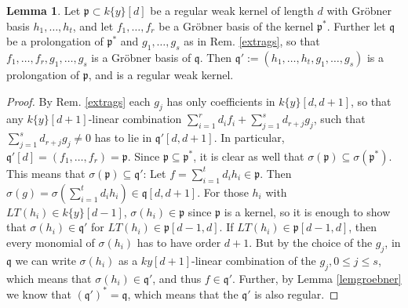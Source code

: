 \documentclass{article}
\def\p{\mathfrak{p}}
\def\q{\mathfrak{q}}
\def\s{\sigma}
\newenvironment{bew}{\begin{proof}[Proof]}{\end{proof}}
\theoremstyle{definition}
\newtheorem{lem}[Satz]{Lemma}
\begin{document}
\begin{lem}
Let $\p \subset k\{y\}[d]$ be a regular weak kernel of length $d$ with Gröbner basis $h_1,\ldots,h_t$, 
and let $f_1,\ldots,f_r$ be a Gröbner basis of the kernel $\p^*$. Further let $\q$ be a prolongation of $\p^*$  and $g_1,\ldots,g_s$ as in Rem. \ref{extrags},
 so that $f_1,\ldots,f_r,g_1,\ldots,g_s$ is a Gröbner basis of $\q$. Then $\q':= (h_1,\ldots,h_t,g_1,\ldots,g_s)$ is a prolongation of $\p$, and is a regular weak kernel. 
 \begin{bew}
By Rem. \ref{extrags} each $g_j$ has only coefficients in $k\{y\}[d,d+1]$, so that any $k\{y\}[d+1]$-linear combination $\sum_{i=1}^r d_i f_i + \sum_{j=1}^s d_{r+j}g_j$,
such that $\sum_{j=1}^s d_{r+j}g_j \neq 0$ has to lie in $\q'[d,d+1]$. In particular, $\q'[d] = (f_1,\ldots,f_r) = \p$.
Since $\p \subseteq \p^*$, it is clear as well that $\s(\p) \subseteq \s(\p^*)$. This means that $\s(\p) \subseteq \q'$:
Let $f = \sum_{i=1}^td_i h_i \in \p$. Then $\s(g) = \s(\sum_{i=1}^td_i h_i) \in \q[d,d+1]$.
For those $h_i$ with $LT(h_i) \in k\{y\}[d-1]$, $\s(h_i) \in \p$ since $\p$ is a kernel, so it is enough to show that $\s(h_i) \in \q'$ for $LT(h_i) \in \p[d-1,d]$.
If $LT(h_i) \in \p[d-1,d]$, then every monomial of $\s(h_i)$ has to have order $d+1$. But by the choice of the $g_j$, in $\q$ we can write $\s(h_i)$ as a $k{y}[d+1]$-linear combination of 
the $g_j, 0 \leq j \leq s$, which means that $\s(h_i) \in \q'$, and thus $f \in \q'$. 
Further, by Lemma \ref{lemgroebner} we know that $(\q')^* = \q$, which means that the $\q'$ is also regular.
\end{bew}
\end{lem}
\end{document}
